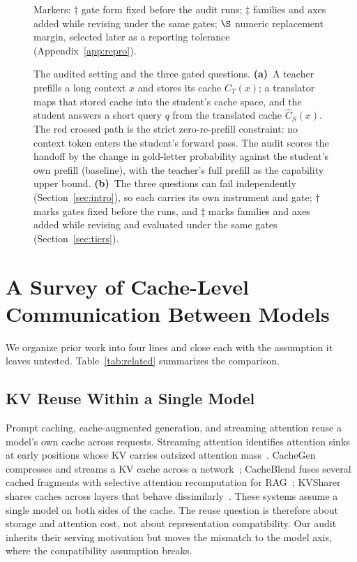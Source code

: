 \documentclass[10pt]{article}
\begin{document}
\begin{figure}[t]
\centering

\caption{The audited setting and the three gated questions.
\textbf{(a)}~A teacher prefills a long context $x$ and stores its cache
$C_T(x)$; a translator maps that stored cache into the student's cache space,
and the student answers a short query $q$ from the translated cache
$\hat{C}_S(x)$. The red crossed path is the strict zero-re-prefill constraint:
no context token enters the student's forward pass. The audit scores the
handoff by the change in gold-letter probability against the student's own
prefill (baseline), with the teacher's full prefill as the capability upper
bound. \textbf{(b)}~The three questions can fail independently
(Section~\ref{sec:intro}), so each carries its own instrument and gate;
$\dagger$ marks gates fixed before the runs, and $\ddagger$ marks families and
axes added while revising and evaluated under the same gates
(Section~\ref{sec:tiers}).}
Markers: $\dagger$ gate form fixed before the audit runs; $\ddagger$ families and axes
added while revising under the same gates; $\S$ numeric replacement margin, selected later as a
reporting tolerance (Appendix~\ref{app:repro}).
\label{fig:framework}
\end{figure}

\section{A Survey of Cache-Level Communication Between Models}
\label{sec:survey}

We organize prior work into four lines and close each with the assumption it
leaves untested. Table~\ref{tab:related} summarizes the comparison.

\subsection{KV Reuse Within a Single Model}
Prompt caching, cache-augmented generation, and streaming attention reuse a
model's own cache across requests. Streaming attention identifies attention
sinks at early positions whose KV carries outsized attention
mass~\citep{streamingsink2023}. CacheGen compresses and streams a KV cache
across a network~\citep{cachegen2024}; CacheBlend fuses several cached
fragments with selective attention recomputation for
RAG~\citep{cacheblend2025}; KVSharer shares caches across layers that behave
dissimilarly~\citep{kvsharer2024}. These systems assume a single model on
both sides of the cache. The reuse question is therefore about storage and
attention cost, not about representation compatibility. Our audit inherits
their serving motivation but moves the mismatch to the model axis, where the
compatibility assumption breaks.
\end{document}
